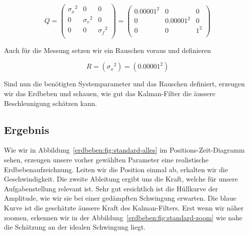 \begin{equation}
	Q = \left(
	\begin{array}{ccc}
		{\sigma_x }^2& 0& 0 \\
		0 & {\sigma_v }^2& 0\\
		0 & 0& {\sigma_f }^2\\
	\end{array}\right)= \left(
	\begin{array}{ccc}
		{0.00001 }^2& 0& 0 \\
		0 & {0.00001 }^2& 0\\
		0 & 0& {1 }^2\\
	\end{array}\right)
\end{equation}

Auch für die Messung setzen wir ein Rauschen voraus und definieren

\begin{equation}
R= ({\sigma_x}^2)=
({0.00001}^2)
\end{equation}

Sind nun die benötigten Systemparameter und das Rauschen definiert, erzeugen wir das Erdbeben und schauen, wie gut das Kalman-Filter die äussere Beschleunigung schätzen kann.

\subsection*{Ergebnis}

Wie wir in Abbildung~\ref{erdbeben:fig:standard-alles} im Positions-Zeit-Diagramm sehen, erzeugen unsere vorher gewählten Parameter eine realistische Erdbebenaufzeichnung.
Leiten wir die Position einmal ab, erhalten wir die Geschwindigkeit.
Die zweite Ableitung ergibt uns die Kraft, welche für unsere Aufgabenstellung relevant ist.
Sehr gut ersichtlich ist die Hüllkurve der Amplitude, wie wir sie bei einer gedämpften Schwingung erwarten.
Die blaue Kurve ist die geschätzte äussere Kraft des Kalman-Filters.
Erst wenn wir näher zoomen, erkennen wir in der Abbildung~\ref{erdbeben:fig:standard-zoom} wie nahe die Schätzung an der idealen Schwingung liegt.


